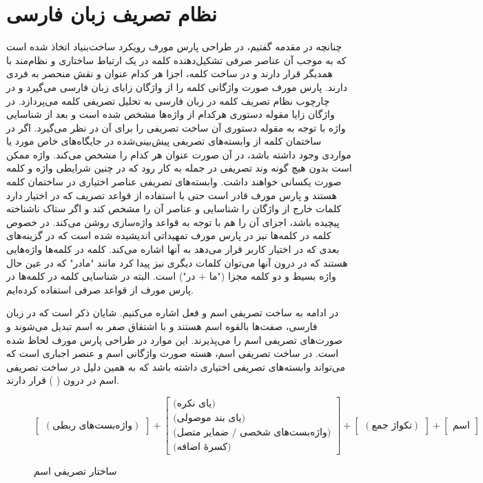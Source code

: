 \documentclass[12pt,onecolumn,a4paper]{article}
\begin{document}
    \section{نظام تصریف زبان فارسی}
    چنانچه در مقدمه گفتیم، در طراحی پارس مورف رویکرد ساخت‌بنیاد اتخاذ شده است که به موجب آن عناصر صرفی تشکیل‌دهنده کلمه در یک ارتباط ساختاری و نظام‌مند با همدیگر قرار دارند و در ساخت کلمه، اجزا هر کدام عنوان و نقش منحصر به فردی دارند. پارس مورف صورت واژگانی کلمه را از واژگان زایای زبان فارسی {\mfo\citep{Eslami83}} می‌گیرد و در چارچوب نظام تصریف کلمه در زبان فارسی {\mfo\citep{Eslami88}} به تحلیل تصریفی کلمه می‌پردازد. در واژگان زایا مقوله دستوری هرکدام از واژه‌ها مشخص شده است و بعد از شناسایی واژه با توجه به مقوله دستوری آن ساخت تصریفی را برای آن در نظر می‌گیرد. اگر در ساختمان کلمه از وابسته‌های تصریفی پیش‌بینی‌شده در جایگاه‌های خاص مورد یا مواردی وجود داشته باشد، در آن صورت عنوان هر کدام را مشخص می‌کند. واژه ممکن است بدون هیچ گونه وند تصریفی در جمله به کار رود که در چنین شرایطی واژه و کلمه صورت یکسانی خواهند داشت. وابسته‌های تصریفی عناصر اختیاری در ساختمان کلمه هستند و پارس مورف قادر است حتی با استفاده از قواعد تصریف که در اختیار دارد کلمات خارج از واژگان را شناسایی و عناصر آن را مشخص کند و اگر ستاک ناشناخته پیچیده باشد، اجزای آن را هم با توجه به قواعد واژه‌سازی روشن می‌کند. در خصوص کلمه در کلمه‌ها  نیز در پارس مورف تمهیداتی اندیشیده شده است که در گزینه‌های بعدی که در اختیار کاربر قرار می‌دهد به آنها اشاره می‌کند. کلمه در کلمه‌ها واژه‌هایی هستند که در درون آنها می‌توان کلمات دیگری نیز پیدا کرد مانند "مادر" که در عین حال واژه بسیط و دو کلمه مجزا ("ما + در") است. البته در شناسایی کلمه در کلمه‌ها در پارس مورف از قواعد صرفی استفاده کرده‌ایم.
    \par
    در ادامه به ساخت تصریفی اسم و فعل اشاره می‌کنیم. شایان ذکر است که در زبان فارسی، صفت‌ها بالقوه اسم هستند و با اشتقاق صفر به اسم تبدیل می‌شوند و صورت‌های تصریفی اسم را می‌پذیرند. این موارد در طراحی پارس مورف لحاظ شده است. در ساخت تصریفی اسم، هسته صورت واژگانی اسم و عنصر اجباری است که می‌تواند وابسته‌های تصریفی اختیاری داشته باشد که به همین دلیل در ساخت تصریفی اسم در درون ( ) قرار دارند.

    \begin{figure}[hp]
        \[
            \begin{bmatrix}
                (\textrm{واژه‌بست‌های ربطی})
            \end{bmatrix}
            +
            \begin{bmatrix}
                \textrm{(یای نکره)} \\
                \textrm{(یای بند موصولی)} \\
                \textrm{(واژه‌بست‌های شخصی / ضمایر متصل)} \\
                \textrm{(کسرهٔ اضافه)}
            \end{bmatrix}
            +
            \begin{bmatrix}
                (\textrm{تکواژ جمع})
            \end{bmatrix}
            +
            \begin{bmatrix}
                \textrm{اسم}
            \end{bmatrix}
        \]
        \caption{ساختار تصریفی اسم {\mfo\citep{Eslami88}}}
    \end{figure}
\end{document}
